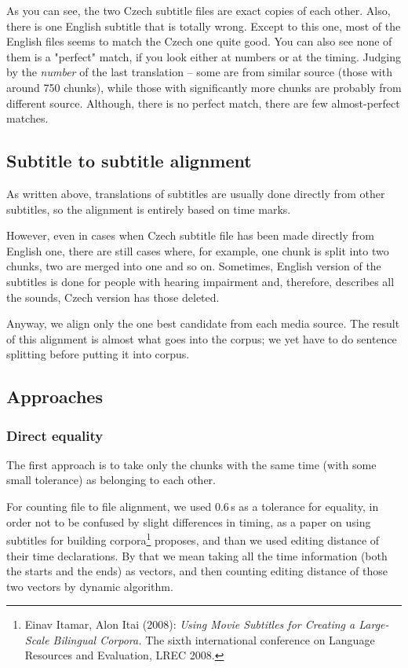 As you can see, the two Czech subtitle files are exact copies of each other. Also, there is one English subtitle that is totally wrong. Except to this one, most of the English files seems to match the Czech one quite good. You can also see none of them is a "perfect" match, if you look either at numbers or at the timing. Judging by the \emph{number} of the last translation -- some are from similar source (those with around 750 chunks), while those with significantly more chunks are probably from different source. Although, there is no perfect match, there are few almost-perfect matches.

\subsection{Subtitle to subtitle alignment}
As written above, translations of subtitles are usually done directly from other subtitles, so the alignment is entirely based on time marks.

However, even in cases when Czech subtitle file has been made directly from English one, there are still cases where, for example, one chunk is split into two chunks, two are merged into one and so on. Sometimes, English version of the subtitles is done for people with hearing impairment and, therefore, describes all the sounds, Czech version has those deleted.

Anyway, we align only the one best candidate from each media source. The result of this alignment is almost what goes into the corpus; we yet have to do sentence splitting before putting it into corpus.

\subsection{Approaches}
\subsubsection{Direct equality}

The first approach is to take only the chunks with the same time (with some small tolerance) as belonging to each other.

For counting file to file alignment, we used 0.6\,s as a tolerance for equality, in order not to be confused by slight differences in timing, as a paper on using subtitles for building corpora\footnote{Einav Itamar, Alon Itai (2008): \emph{Using Movie Subtitles for Creating a Large-Scale Bilingual Corpora.} The sixth international conference on Language Resources and Evaluation, LREC 2008.} proposes, and than we used editing distance of their time declarations. By that we mean taking all the time information (both the starts and the ends) as vectors, and then counting editing distance of those two vectors by dynamic algorithm.

